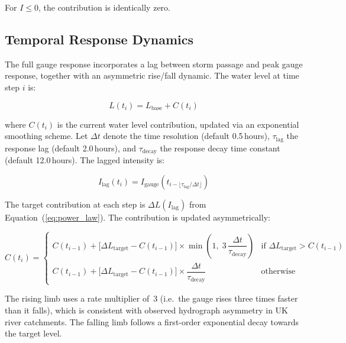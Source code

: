 \documentclass[11pt,a4paper]{article}
\begin{document}
\noindent For $I \leq 0$, the contribution is identically zero.

\subsection{Temporal Response Dynamics}
\label{sec:temporal_dynamics}

The full gauge response incorporates a lag between storm passage and peak gauge
response, together with an asymmetric rise/fall dynamic. The water level at
time step $i$ is:

\begin{equation}
    L(t_i) = L_{\text{base}} + C(t_i)
    \label{eq:gauge_level}
\end{equation}

\noindent where $C(t_i)$ is the current water level contribution, updated via an
exponential smoothing scheme. Let $\Delta t$ denote the time resolution
(default 0.5\,hours), $\tau_{\text{lag}}$ the response lag (default 2.0\,hours),
and $\tau_{\text{decay}}$ the response decay time constant (default 12.0\,hours).
The lagged intensity is:

\begin{equation}
    I_{\text{lag}}(t_i) = I_{\text{gauge}}\!\left(t_{i - \lfloor \tau_{\text{lag}}/\Delta t \rfloor}\right)
    \label{eq:lagged_intensity}
\end{equation}

The target contribution at each step is $\Delta L(I_{\text{lag}})$ from
Equation~(\ref{eq:power_law}). The contribution is updated asymmetrically:

\begin{equation}
    C(t_i) = \begin{cases}
        C(t_{i-1}) + \bigl[\Delta L_{\text{target}} - C(t_{i-1})\bigr]
            \times \min\!\left(1,\; 3\,\dfrac{\Delta t}{\tau_{\text{decay}}}\right)
        & \text{if } \Delta L_{\text{target}} > C(t_{i-1}) \\[1em]
        C(t_{i-1}) + \bigl[\Delta L_{\text{target}} - C(t_{i-1})\bigr]
            \times \dfrac{\Delta t}{\tau_{\text{decay}}}
        & \text{otherwise}
    \end{cases}
    \label{eq:contribution_update}
\end{equation}

The rising limb uses a rate multiplier of~3 (i.e.\ the gauge rises three times
faster than it falls), which is consistent with observed hydrograph asymmetry in
UK river catchments. The falling limb follows a first-order exponential decay
towards the target level.
\end{document}
